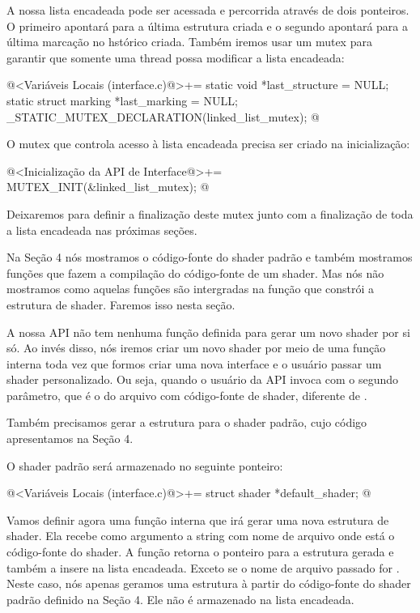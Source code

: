 A nossa lista encadeada pode ser acessada e percorrida através de dois
ponteiros. O primeiro apontará para a última estrutura criada e o
segundo apontará para a última marcação no hstórico criada. Também
iremos usar um mutex para garantir que somente uma thread possa
modificar a lista encadeada:

\iniciocodigo
@<Variáveis Locais (interface.c)@>+=
static void *last_structure = NULL;
static struct marking *last_marking = NULL;
_STATIC_MUTEX_DECLARATION(linked_list_mutex);
@
\fimcodigo

O mutex que controla acesso à lista encadeada precisa ser criado na
inicialização:

\iniciocodigo
@<Inicialização da API de Interface@>+=
MUTEX_INIT(&linked_list_mutex);
@
\fimcodigo

Deixaremos para definir a finalização deste mutex junto com a
finalização de toda a lista encadeada nas próximas seções.


Na Seção 4 nós mostramos o código-fonte do shader padrão e também
mostramos funções que fazem a compilação do código-fonte de um
shader. Mas nós não mostramos como aquelas funções são intergradas na
função que constrói a estrutura de shader. Faremos isso nesta seção.

A nossa API não tem nenhuma função definida para gerar um novo shader
por si só. Ao invés disso, nós iremos criar um novo shader por meio de
uma função interna toda vez que formos criar uma nova interface e o
usuário passar um shader personalizado. Ou seja, quando o usuário da
API invoca  com o segundo parâmetro, que
é o do arquivo com código-fonte de shader, diferente
de .

Também precisamos gerar a estrutura para o shader padrão, cujo código
apresentamos na Seção 4.

O shader padrão será armazenado no seguinte ponteiro:

\iniciocodigo
@<Variáveis Locais (interface.c)@>+=
struct shader *default_shader;
@
\fimcodigo

Vamos definir agora uma função interna que irá gerar uma nova
estrutura de shader. Ela recebe como argumento a string com nome de
arquivo onde está o código-fonte do shader. A função retorna o
ponteiro para a estrutura gerada e também a insere na lista
encadeada. Exceto se o nome de arquivo passado
for . Neste caso, nós apenas geramos uma estrutura à
partir do código-fonte do shader padrão definido na Seção 4. Ele não é
armazenado na lista encadeada.

